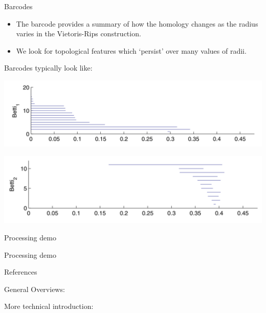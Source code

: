 \documentclass[usenames,dvipsnames,aspectratio=1610]{beamer}
\begin{document}
\begin{frame}{Barcodes}
  \begin{itemize}
    \item The barcode provides a summary of how the homology changes as the
      radius varies in the Vietoris-Rips construction.
    \item We look for topological features which `persist' over many values of radii.
  \end{itemize}

  Barcodes typically look like:

  \begin{minipage}{\textwidth}
  \begin{minipage}{0.5\textwidth}
    \centering
    \includegraphics[scale=0.25]{images/betti1.png}
  \end{minipage}
  \begin{minipage}{0.5\textwidth}
    \centering
    \includegraphics[scale=0.25]{images/betti2.png}
  \end{minipage}
\end{minipage}
\end{frame}

\begin{frame}{Processing demo}
  \begin{center} Processing demo \end{center}
  \end{frame}



\begin{frame}{References}
\nocite{ghrist2017homological, bubenik_statistical_2015, carlsson_topology_2009,
oudot2015persistence, perea_brief_2018, wright}

\renewcommand*{\bibfont}{\small}
General Overviews:
\printbibliography[keyword=intro]

More technical introduction:
\printbibliography[keyword=nintro]


\end{frame}
\end{document}
